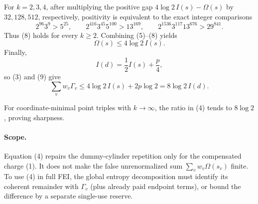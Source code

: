 For $k=2,3,4$, after multiplying the positive gap
$4\log2\,I(s)-\Omega(s)$ by $32,128,512$, respectively, positivity is
equivalent to the exact integer comparisons
\[
 2^{96}3^9>5^{25},\qquad
 2^{416}3^{45}5^{100}>13^{169},\qquad
 2^{1536}3^{117}13^{676}>29^{841}.
\]
Thus (8) holds for every $k\ge2$.  Combining (5)--(8) yields
\[
 \Omega(s)\le4\log2\,I(s).                            \tag{9}
\]
Finally,
\[
 I(d)=\frac12I(s)+\frac p4,
\]
so (3) and (9) give
\[
 \sum_vw_v\Gamma_v
 \le4\log2\,I(s)+2p\log2
 =8\log2\,I(d).
\]

For coordinate-minimal point triples with $k\to\infty$, the ratio in (4)
tends to $8\log2$, proving sharpness.

\paragraph{Scope.}
Equation (4) repairs the dummy-cylinder repetition only for the compensated
charge (1).  It does not make the false unrenormalized sum
$\sum_vw_v\Omega(s_v)$ finite.  To use (4) in full FEI, the global entropy
decomposition must identify its coherent remainder with $\Gamma_v$ (plus
already paid endpoint terms), or bound the difference by a separate
single-use reserve.

